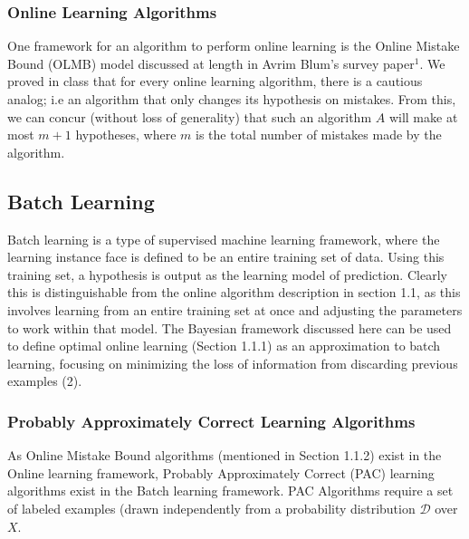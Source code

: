 																																									        \subsubsection{Online Learning Algorithms}
																																											            One framework for an algorithm to perform online learning is the Online Mistake Bound (OLMB) model discussed at length in Avrim Blum's survey paper$^1$. We proved in class that for every online learning algorithm, there is a cautious analog; i.e an algorithm that only changes its hypothesis on mistakes. From this, we can concur (without loss of generality) that such an algorithm $A$ will make at most $m+1$ hypotheses, where $m$ is the total number of mistakes made by the algorithm.
																																														            
																																																	    \subsection{Batch Learning}
																																																		    
																																																			    Batch learning is a type of supervised machine learning framework, where the learning instance face is defined to be an entire training set of data. Using this training set, a hypothesis is output as the learning model of prediction. Clearly this is distinguishable from the online algorithm description in section 1.1, as this involves learning from an entire training set at once and adjusting the parameters to work within that model. The Bayesian framework discussed here can be used to define optimal online learning (Section 1.1.1) as an approximation to batch learning, focusing on minimizing the loss of information from discarding previous examples (2).
																																																				    
																																																					    \subsubsection{Probably Approximately Correct Learning Algorithms}
																																																						    As Online Mistake Bound algorithms (mentioned in Section 1.1.2) exist in the Online learning framework, Probably Approximately Correct (PAC) learning algorithms exist in the Batch learning framework. PAC Algorithms require a set of labeled examples (drawn independently from a probability distribution $\mathcal{D}$ over $X$. \vspace{4mm}
																																																							    
